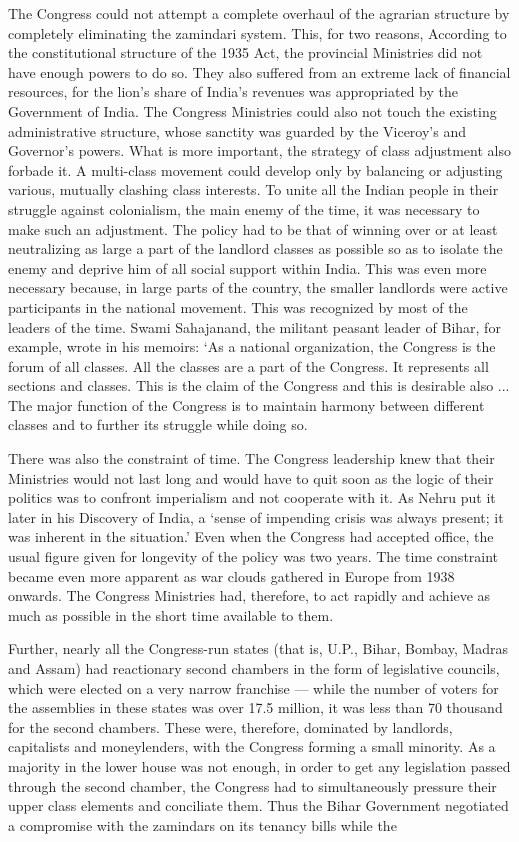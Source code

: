 \begin{multicols}{2}
The Congress could not attempt a complete overhaul of the agrarian structure by completely eliminating the zamindari system. This, for two reasons, According to the constitutional structure of the 1935 Act, the provincial Ministries did not have enough powers to do so. They also suffered from an extreme lack of financial resources, for the lion's share of India's revenues was appropriated by the Government of India. The Congress Ministries could also not touch the existing administrative structure, whose sanctity was guarded by the Viceroy's and Governor's powers. What is more important, the strategy of class adjustment also forbade it. A multi-class movement could develop only by balancing or adjusting various, mutually clashing class interests. To unite all the Indian people in their struggle against colonialism, the main enemy of the time, it was necessary to make such an adjustment. The policy had to be that of winning over or at least neutralizing as large a part of the landlord classes as possible so as to isolate the enemy and deprive him of all social support within India. This was even more necessary because, in large parts of the country, the smaller landlords were active participants in the national movement. This was recognized by most of the leaders of the time. Swami Sahajanand, the militant peasant leader of Bihar, for example, wrote in his memoirs: `As a national organization, the Congress is the forum of all classes. All the classes are a part of the Congress. It represents all sections and classes. This is the claim of the Congress and this is desirable also ... The major function of the Congress is to maintain harmony between different classes and to further its struggle while doing so. 

There was also the constraint of time. The Congress leadership knew that their Ministries would not last long and would have to quit soon as the logic of their politics was to confront imperialism and not cooperate with it. As Nehru put it later in his Discovery of India, a `sense of impending crisis was always present; it was inherent in the situation.' Even when the Congress had accepted office, the usual figure given for longevity of the policy was two years. The time constraint became even more apparent as war clouds gathered in Europe from 1938 onwards. The Congress Ministries had, therefore, to act rapidly and achieve as much as possible in the short time available to them. 

Further, nearly all the Congress-run states (that is, U.P., Bihar, Bombay, Madras and Assam) had reactionary second chambers in the form of legislative councils, which were elected on a very narrow franchise --- while the number of voters for the assemblies in these states was over 17.5 million, it was less than 70 thousand for the second chambers. These were, therefore, dominated by landlords, capitalists and moneylenders, with the Congress forming a small minority. As a majority in the lower house was not enough, in order to get any legislation passed through the second chamber, the Congress had to simultaneously pressure their upper class elements and conciliate them. Thus the Bihar Government negotiated a compromise with the zamindars on its tenancy bills while the 


\end{multicols}
